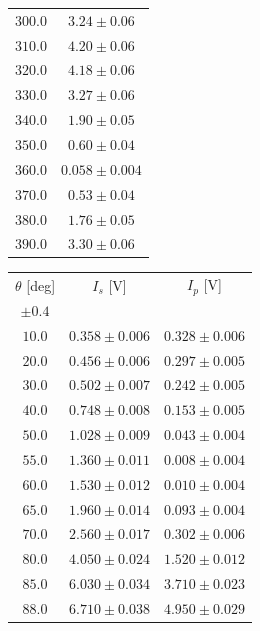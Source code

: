 \documentclass[10pt,oneside,a4paper]{article}
\begin{document}
\begin{table}[H]
\begin{tabular}{cc}
  $300.0$ &$ 3.24 \pm 0.06$ \\
  $310.0$ &$ 4.20 \pm 0.06$ \\
  $320.0$ &$ 4.18 \pm 0.06$ \\
  $330.0$ &$ 3.27 \pm 0.06$ \\
  $340.0$ &$ 1.90 \pm 0.05$ \\
  $350.0$ &$ 0.60 \pm 0.04$ \\
  $360.0$ &$ 0.058 \pm 0.004$ \\
  $370.0$ &$ 0.53 \pm 0.04$ \\
  $380.0$ &$ 1.76 \pm 0.05$ \\
  $390.0$ &$ 3.30 \pm 0.06$ \\
\hline
\end{tabular}
\end{table}





\begin{table}[H]
\centering
{}
\label{tab:brewster}
\begin{tabular}{ccc}
\hline
 $\theta$ [deg]& $I_s$ [V]&$I_p$ [V]\\
 $\pm 0.4$ & &\\
\hline
   $10.0   $&  $ 0.358 \pm 0.006   $&$ 0.328 \pm 0.006 $\\
   $20.0   $&  $ 0.456 \pm 0.006   $&$ 0.297 \pm 0.005 $\\
   $30.0   $&  $ 0.502 \pm 0.007   $&$ 0.242 \pm 0.005 $\\
   $40.0   $&  $ 0.748 \pm 0.008   $&$ 0.153 \pm 0.005 $\\
   $50.0   $&  $ 1.028 \pm 0.009   $&$ 0.043 \pm 0.004 $\\
   $55.0   $&  $ 1.360 \pm 0.011    $&$ 0.008 \pm 0.004 $\\
   $60.0   $&  $ 1.530 \pm 0.012   $&$ 0.010 \pm 0.004 $\\
   $65.0   $&  $ 1.960 \pm 0.014   $&$ 0.093 \pm 0.004 $\\
   $70.0   $&  $ 2.560 \pm 0.017   $&$ 0.302 \pm 0.006 $\\
   $80.0   $&  $ 4.050 \pm 0.024   $&$ 1.520 \pm 0.012 $\\
   $85.0   $&  $ 6.030 \pm 0.034   $&$ 3.710 \pm 0.023 $\\
   $88.0   $&  $ 6.710 \pm 0.038  $&$ 4.950 \pm 0.029 $\\
\hline
\end{tabular}
\end{table}
\end{document}
